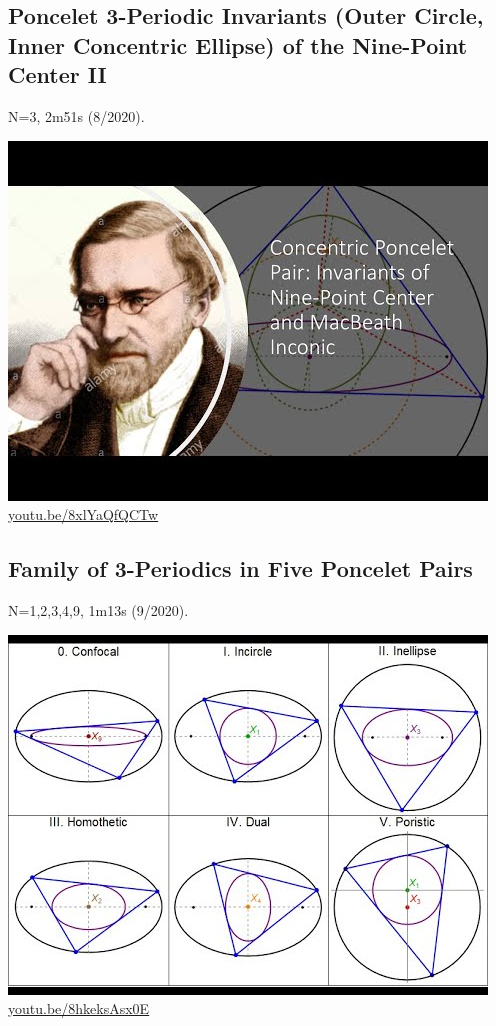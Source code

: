 \documentclass[12pt]{amsart}
\begin{document}
\subsection{Poncelet 3-Periodic Invariants (Outer Circle, Inner Concentric Ellipse) of the Nine-Point Center II}
\label{vid:8xlYaQfQCTw}
\noindent N=3, 2m51s (8/2020). 
\begin{center}\includegraphics[width=.5\textwidth]{pics/8xlYaQfQCTw.jpg} \\ 
\href{https://youtu.be/8xlYaQfQCTw}{\url{youtu.be/8xlYaQfQCTw}}\end{center}
% 

\subsection{Family of 3-Periodics in Five Poncelet Pairs}
\label{vid:8hkeksAsx0E}
\noindent N=1,2,3,4,9, 1m13s (9/2020). 
\begin{center}\includegraphics[width=.5\textwidth]{pics/8hkeksAsx0E.jpg} \\ 
\href{https://youtu.be/8hkeksAsx0E}{\url{youtu.be/8hkeksAsx0E}}\end{center}
% 
\end{document}
